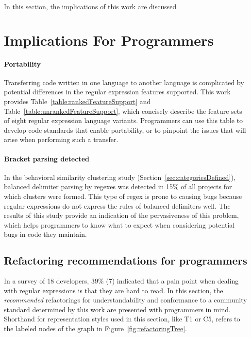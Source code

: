 In this section, the implications of this work are discussed

\section{Implications For Programmers}

\paragraph{Portability} Transferring code written in one language to another language is complicated by potential differences in the regular expression features supported.  This work provides Table~\ref{table:rankedFeatureSupport} and Table~\ref{table:unrankedFeatureSupport}, which concisely describe the feature sets of eight regular expression language variants.  Programmers can use this table to develop code standards that enable portability, or to pinpoint the issues that will arise when performing such a transfer.

\paragraph{Bracket parsing detected} In the behavioral similarity clustering study (Section~\ref{sec:categoriesDefined}), balanced delimiter parsing by regexes was detected in 15\% of all projects for which clusters were formed.  This type of regex is prone to causing bugs because regular expressions do not express the rules of balanced delimiters well.  The results of this study provide an indication of the pervasiveness of this problem, which helps programmers to know what to expect when considering potential bugs in code they maintain.

\subsection{Refactoring recommendations for programmers}
In a survey of 18 developers, 39\% (7) indicated that a pain point when dealing with regular expressions is that they are hard to read.  In this section, the \emph{recommended} refactorings for understandability and conformance to a community standard determined by this work are presented with programmers in mind.  Shorthand for representation styles used in this section, like T1 or C5, refers to the labeled nodes of the graph in Figure~\ref{fig:refactoringTree}.

